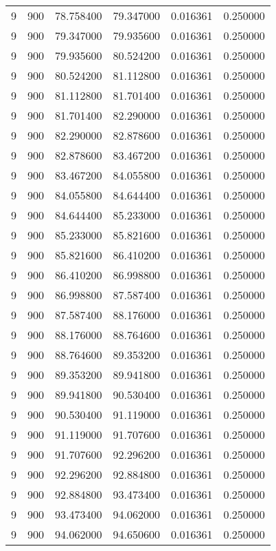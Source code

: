 \begin{longtable}{rrrrrr}
9 & 900 & 78.758400 & 79.347000 & 0.016361 & 0.250000 \\
9 & 900 & 79.347000 & 79.935600 & 0.016361 & 0.250000 \\
9 & 900 & 79.935600 & 80.524200 & 0.016361 & 0.250000 \\
9 & 900 & 80.524200 & 81.112800 & 0.016361 & 0.250000 \\
9 & 900 & 81.112800 & 81.701400 & 0.016361 & 0.250000 \\
9 & 900 & 81.701400 & 82.290000 & 0.016361 & 0.250000 \\
9 & 900 & 82.290000 & 82.878600 & 0.016361 & 0.250000 \\
9 & 900 & 82.878600 & 83.467200 & 0.016361 & 0.250000 \\
9 & 900 & 83.467200 & 84.055800 & 0.016361 & 0.250000 \\
9 & 900 & 84.055800 & 84.644400 & 0.016361 & 0.250000 \\
9 & 900 & 84.644400 & 85.233000 & 0.016361 & 0.250000 \\
9 & 900 & 85.233000 & 85.821600 & 0.016361 & 0.250000 \\
9 & 900 & 85.821600 & 86.410200 & 0.016361 & 0.250000 \\
9 & 900 & 86.410200 & 86.998800 & 0.016361 & 0.250000 \\
9 & 900 & 86.998800 & 87.587400 & 0.016361 & 0.250000 \\
9 & 900 & 87.587400 & 88.176000 & 0.016361 & 0.250000 \\
9 & 900 & 88.176000 & 88.764600 & 0.016361 & 0.250000 \\
9 & 900 & 88.764600 & 89.353200 & 0.016361 & 0.250000 \\
9 & 900 & 89.353200 & 89.941800 & 0.016361 & 0.250000 \\
9 & 900 & 89.941800 & 90.530400 & 0.016361 & 0.250000 \\
9 & 900 & 90.530400 & 91.119000 & 0.016361 & 0.250000 \\
9 & 900 & 91.119000 & 91.707600 & 0.016361 & 0.250000 \\
9 & 900 & 91.707600 & 92.296200 & 0.016361 & 0.250000 \\
9 & 900 & 92.296200 & 92.884800 & 0.016361 & 0.250000 \\
9 & 900 & 92.884800 & 93.473400 & 0.016361 & 0.250000 \\
9 & 900 & 93.473400 & 94.062000 & 0.016361 & 0.250000 \\
9 & 900 & 94.062000 & 94.650600 & 0.016361 & 0.250000 \\

\end{longtable}

